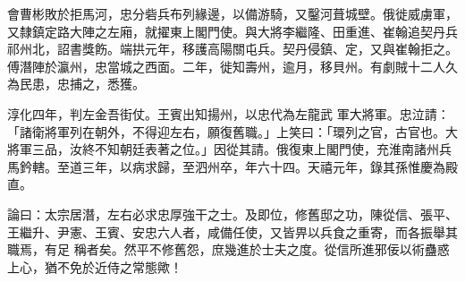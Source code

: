 \begin{pinyinscope}
 會曹彬敗於拒馬河，忠分砦兵布列緣邊，以備游騎，又鑿河葺城壁。俄徙威虜軍，又隸鎮定路大陣之左廂，就擢東上閣門使。與大將李繼隆、田重進、崔翰追契丹兵祁州北，詔書獎飭。端拱元年，移護高陽關屯兵。契丹侵鎮、定，又與崔翰拒之。傅潛陣於瀛州，忠當城之西面。二年，徙知壽州，逾月，移貝州。有劇賊十二人久為民患，忠捕之，悉獲。



 淳化四年，判左金吾街仗。王賓出知揚州，以忠代為左龍武
 軍大將軍。忠泣請：「諸衛將軍列在朝外，不得迎左右，願復舊職。」上笑曰：「環列之官，古官也。大將軍三品，汝終不知朝廷表著之位。」因從其請。俄復東上閣門使，充淮南諸州兵馬鈐轄。至道三年，以病求歸，至泗州卒，年六十四。天禧元年，錄其孫惟慶為殿直。



 論曰：太宗居潛，左右必求忠厚強干之士。及即位，修舊邸之功，陳從信、張平、王繼升、尹憲、王賓、安忠六人者，咸備任使，又皆畀以兵食之重寄，而各振舉其職焉，有足
 稱者矣。然平不修舊怨，庶幾進於士夫之度。從信所進邪佞以術蠱惑上心，猶不免於近侍之常態歟！



\end{pinyinscope}
